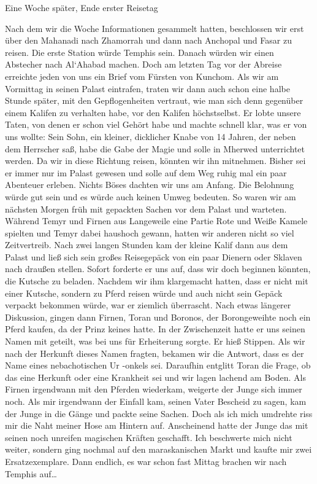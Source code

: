 Eine Woche später, Ende erster Reisetag

Nach dem wir die Woche Informationen gesammelt hatten, beschlossen wir erst über den Mahanadi nach Zhamorrah und dann nach Anchopal und Fasar zu reisen. Die erste Station würde Temphis sein. Danach würden wir einen Abstecher nach Al`Ahabad machen. Doch am letzten Tag vor der Abreise erreichte jeden von uns ein Brief vom Fürsten von Kunchom. Als wir am Vormittag in seinen Palast eintrafen, traten wir dann auch schon eine halbe Stunde später, mit den Gepflogenheiten vertraut, wie man sich denn gegenüber einem Kalifen zu verhalten habe, vor den Kalifen höchstselbst. Er lobte unsere Taten, von denen er schon viel Gehört habe und machte schnell klar, was er von uns wollte: Sein Sohn, ein kleiner, dicklicher Knabe von 14 Jahren, der neben dem Herrscher saß, habe die Gabe der Magie und solle in Mherwed unterrichtet werden. Da wir in diese Richtung reisen, könnten wir ihn mitnehmen. Bisher sei er immer nur im Palast gewesen und solle auf dem Weg ruhig mal ein paar Abenteuer erleben. Nichts Böses dachten wir uns am Anfang. Die Belohnung würde gut sein und es würde auch keinen Umweg bedeuten. So waren wir am nächsten Morgen früh mit gepackten Sachen vor dem Palast und warteten. Während Temyr und Firnen aus Langeweile eine Partie Rote und Weiße Kamele spielten und Temyr dabei haushoch gewann, hatten wir anderen nicht so viel Zeitvertreib. Nach zwei langen Stunden kam der kleine Kalif dann aus dem Palast und ließ sich sein großes Reisegepäck von ein paar Dienern oder Sklaven nach draußen stellen. Sofort forderte er uns auf, dass wir doch beginnen könnten, die Kutsche zu beladen. Nachdem wir ihm klargemacht hatten, dass er nicht mit einer Kutsche, sondern zu Pferd reisen würde und auch nicht sein Gepäck verpackt bekommen würde, war er ziemlich überrascht. Nach etwas längerer Diskussion, gingen dann Firnen, Toran und Boronos, der Borongeweihte noch ein Pferd kaufen, da der Prinz keines hatte. In der Zwischenzeit hatte er uns seinen Namen mit geteilt, was bei uns für Erheiterung sorgte. Er hieß Stippen. Als wir nach der Herkunft dieses Namen fragten, bekamen wir die Antwort, dass es der Name eines nebachotischen Ur -onkels sei. Daraufhin entglitt Toran die Frage, ob das eine Herkunft oder eine Krankheit sei und wir lagen lachend am Boden. Als Firnen irgendwann mit den Pferden wiederkam, weigerte der Junge sich immer noch. Als mir irgendwann der Einfall kam, seinen Vater Bescheid zu sagen, kam der Junge in die Gänge und packte seine Sachen. Doch als ich mich umdrehte riss mir die Naht meiner Hose am Hintern auf. Anscheinend hatte der Junge das mit seinen noch unreifen magischen Kräften geschafft. Ich beschwerte mich nicht weiter, sondern ging nochmal auf den maraskanischen Markt und kaufte mir zwei Ersatzexemplare. Dann endlich, es war schon fast Mittag brachen wir nach Temphis auf\dots

